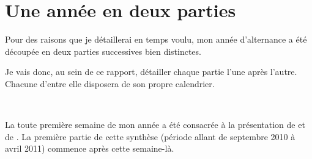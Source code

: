 \chapter{Une année en deux parties}
Pour des raisons que je détaillerai en temps voulu, mon année d'alternance a été découpée en deux parties successives bien distinctes.

Je vais donc, au sein de ce rapport, détailler chaque partie l'une après l'autre. Chacune d'entre elle disposera de son propre calendrier.

~

La toute première semaine de mon année a été consacrée à la présentation de \solulog{} et de \integrale. La première partie de cette synthèse (période allant de septembre 2010 à avril 2011) commence après cette semaine-là.
